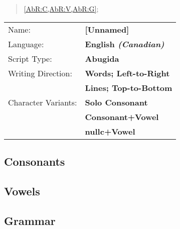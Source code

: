 \label{AbR}
\begin{abstract}
\cref{AbR:C,AbR:V,AbR:G};\\
\end{abstract}
\begin{tabular}{@{}l l@{}}
Name:               & \textbf{[Unnamed]}                  \\
Language:           & \textbf{English \emph{(Canadian)}}  \\
Script Type:        & \textbf{Abugida}                    \\
Writing Direction:  & \textbf{Words; Left-to-Right}       \\
                    & \textbf{Lines; Top-to-Bottom}       \\
Character Variants: & \textbf{Solo Consonant}             \\
                    & \textbf{Consonant+Vowel}            \\
                    & \textbf{\gls{nullc}+Vowel}%
\end{tabular}

\newpage
\subsection{Consonants}


\newpage
\subsection{Vowels}


\newpage
\subsection{Grammar}
